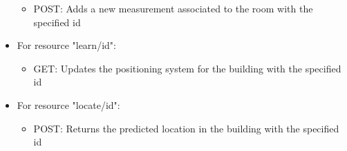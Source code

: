 \begin{itemize}
\begin{itemize}
	\item POST: Adds a new measurement associated to the room with the specified id
	\end{itemize}
\item For resource "learn/id":
	\begin{itemize}
	\item GET: Updates the positioning system for the building with the specified id
	\end{itemize}
\item For resource "locate/id":
	\begin{itemize}
	\item POST: Returns the predicted location in the building with the specified id
	\end{itemize}
\end{itemize}

